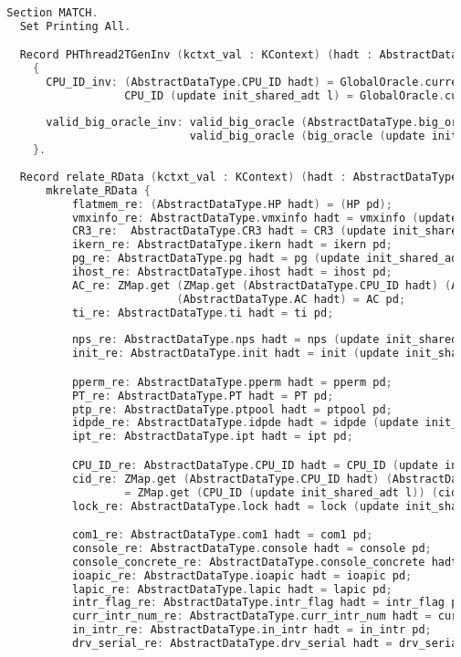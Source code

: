 \begin{lstlisting}[language=C]

  Section MATCH.
    Set Printing All.

    Record PHThread2TGenInv (kctxt_val : KContext) (hadt : AbstractDataType.RData) (l : Log) (pd : dproc) :=
      { 
        CPU_ID_inv: (AbstractDataType.CPU_ID hadt) = GlobalOracle.current_CPU_ID /\
                    CPU_ID (update init_shared_adt l) = GlobalOracle.current_CPU_ID;
        
        valid_big_oracle_inv: valid_big_oracle (AbstractDataType.big_oracle hadt) /\
                              valid_big_oracle (big_oracle (update init_shared_adt l))
      }.
    
    Record relate_RData (kctxt_val : KContext) (hadt : AbstractDataType.RData) (l : Log) (pd : dproc) :=
        mkrelate_RData {
            flatmem_re: (AbstractDataType.HP hadt) = (HP pd);
            vmxinfo_re: AbstractDataType.vmxinfo hadt = vmxinfo (update init_shared_adt l);
            CR3_re:  AbstractDataType.CR3 hadt = CR3 (update init_shared_adt l);
            ikern_re: AbstractDataType.ikern hadt = ikern pd;
            pg_re: AbstractDataType.pg hadt = pg (update init_shared_adt l);
            ihost_re: AbstractDataType.ihost hadt = ihost pd;
            AC_re: ZMap.get (ZMap.get (AbstractDataType.CPU_ID hadt) (AbstractDataType.cid hadt))
                            (AbstractDataType.AC hadt) = AC pd;
            ti_re: AbstractDataType.ti hadt = ti pd;
            
            nps_re: AbstractDataType.nps hadt = nps (update init_shared_adt l);
            init_re: AbstractDataType.init hadt = init (update init_shared_adt l);

            pperm_re: AbstractDataType.pperm hadt = pperm pd;
            PT_re: AbstractDataType.PT hadt = PT pd;
            ptp_re: AbstractDataType.ptpool hadt = ptpool pd;
            idpde_re: AbstractDataType.idpde hadt = idpde (update init_shared_adt l);
            ipt_re: AbstractDataType.ipt hadt = ipt pd;

            CPU_ID_re: AbstractDataType.CPU_ID hadt = CPU_ID (update init_shared_adt l);
            cid_re: ZMap.get (AbstractDataType.CPU_ID hadt) (AbstractDataType.cid hadt)
                    = ZMap.get (CPU_ID (update init_shared_adt l)) (cid (update init_shared_adt l));
            lock_re: AbstractDataType.lock hadt = lock (update init_shared_adt l);

            com1_re: AbstractDataType.com1 hadt = com1 pd;
            console_re: AbstractDataType.console hadt = console pd;
            console_concrete_re: AbstractDataType.console_concrete hadt = console_concrete pd;
            ioapic_re: AbstractDataType.ioapic hadt = ioapic pd;
            lapic_re: AbstractDataType.lapic hadt = lapic pd;
            intr_flag_re: AbstractDataType.intr_flag hadt = intr_flag pd;
            curr_intr_num_re: AbstractDataType.curr_intr_num hadt = curr_intr_num pd;
            in_intr_re: AbstractDataType.in_intr hadt = in_intr pd;
            drv_serial_re: AbstractDataType.drv_serial hadt = drv_serial pd;


\end{lstlisting}
